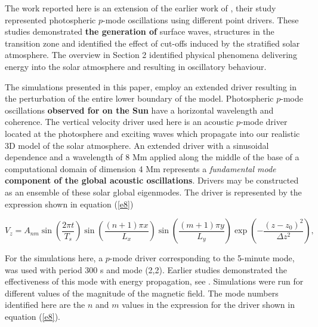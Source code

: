 \documentclass[physics,article,submit,pdftex,moreauthors]{Definitions/mdpi}
\begin{document}
The work reported here is an extension of the earlier work of \citet{Malins2007}, their study represented photospheric $p$-mode oscillations using different point drivers. These studies demonstrated {\bf the generation of} surface waves, structures in the transition zone and identified the effect of cut-offs induced by the stratified  solar atmosphere. The overview in Section 2 identified physical phenomena delivering energy into the solar atmosphere and resulting in oscillatory behaviour. 

The simulations presented in this paper, employ an extended driver resulting in the perturbation of the entire lower boundary of the model.  Photospheric $p$-mode oscillations {\bf observed for on the Sun} have a horizontal wavelength and coherence. The vertical velocity driver used here is an acoustic $p$-mode driver located at the photosphere and exciting waves which propagate 
into our realistic 3D model of the solar atmosphere. An extended driver with a sinusoidal dependence and a wavelength of 8 Mm applied along the middle of the base of a computational domain of dimension 4 Mm represents  a {\it fundamental mode} {\bf component of the global acoustic oscillations}. Drivers may be constructed as an ensemble of these solar global eigenmodes. The driver is represented by the expression shown in equation (\ref{e8}) 


\begin{equation}
 V_{z}  =  A_{nm} \sin\left(\frac{2\pi t}{T_s} \right)\sin\left(  \frac{(n+1)\pi x}{L_x} \right)  
 \sin\left(\frac{(m+1)\pi y}{L_y} \right) \exp\left( -\frac{(z-z_0)^2}{\Delta z^2} \right),
\label{e8}
\end{equation}

For the  simulations here, a $p$-mode driver corresponding to the 5-minute mode, was used with period 300 s and mode (2,2). Earlier studies demonstrated the effectiveness of this mode with energy propagation, see \citet{Griffiths2018b}. Simulations were run for different values of the magnitude of the magnetic field. The mode numbers identified here are the $n$ and $m$ values in the expression for the driver shown in equation (\ref{e8}).

\end{document}
